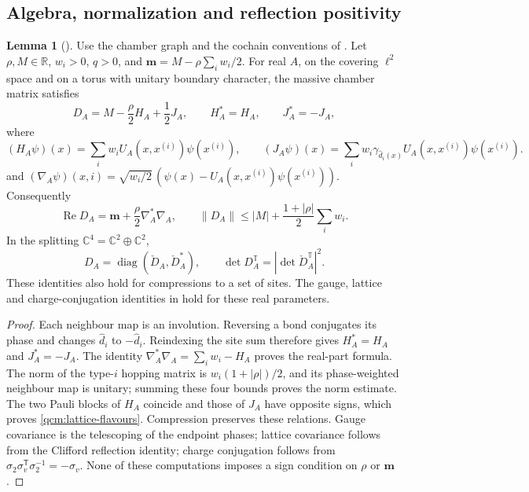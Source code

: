 \documentclass[11pt,letterpaper,reqno]{amsart}
\theoremstyle{definition}
\newtheorem{qcmlemma}[qcmproposition]{Lemma}
\newenvironment{lemma}[1][]{\pushQED{\qed}\renewcommand{\qedsymbol}{$\blacksquare$}\begin{qcmlemma}[#1]}{\popQED\end{qcmlemma}}
\begin{document}
\subsection{Algebra, normalization and reflection positivity}
\begin{lemma}\label{qcm:lattice-algebra}
Use the chamber graph and the cochain conventions of
\cite[Section~2]{QEDConstruction}. Let $\rho,M\in\mathbb R$,
$w_i>0$, $q>0$, and $\mathbf m=M-\rho\sum_iw_i/2$. For real $A$,
on the covering $\ell^2$ space and on a torus with unitary boundary
character, the massive chamber matrix satisfies
\[
 D_A=M-\frac\rho2H_A+\frac12J_A,\qquad
 H_A^*=H_A,\qquad J_A^*=-J_A,
\]
where
\[
 (H_A\psi)(x)=\sum_iw_iU_A(x,x^{(i)})\psi(x^{(i)}),\qquad
 (J_A\psi)(x)=\sum_iw_i\gamma_{\widehat d_i(x)}
                         U_A(x,x^{(i)})\psi(x^{(i)}).
\]
and $(\nabla_A\psi)(x,i)=\sqrt{w_i/2}\,
(\psi(x)-U_A(x,x^{(i)})\psi(x^{(i)}))$.
Consequently
\begin{equation}\label{qcm:lattice-real-part}
 \operatorname{Re}D_A=\mathbf m+\frac\rho2\nabla_A^*\nabla_A,
 \qquad
 \|D_A\|\le |M|+\frac{1+|\rho|}{2}\sum_iw_i.
\end{equation}
In the splitting $\mathbb C^4=\mathbb C^2\oplus\mathbb C^2$,
\begin{equation}\label{qcm:lattice-flavours}
 D_A=\operatorname{diag}(\check D_A,\check D_A^*),\qquad
 \det D_A^{\mathbb T}=|\det\check D_A^{\mathbb T}|^2.
\end{equation}
These identities also hold for compressions to a set of sites. The
gauge, lattice and charge-conjugation identities in
\cite[Section~2.4]{QEDConstruction} hold for these real parameters.
\end{lemma}

\begin{proof}
Each neighbour map is an involution. Reversing a bond conjugates its
phase and changes $\widehat d_i$ to $-\widehat d_i$. Reindexing the
site sum therefore gives $H_A^*=H_A$ and $J_A^*=-J_A$.
The identity $\nabla_A^*\nabla_A=\sum_iw_i-H_A$ proves the real-part
formula. The norm of the type-$i$ hopping matrix is
$w_i(1+|\rho|)/2$, and its phase-weighted neighbour map is unitary;
summing these four bounds proves the norm estimate. The two Pauli
blocks of $H_A$ coincide and those of $J_A$ have opposite signs,
which proves \eqref{qcm:lattice-flavours}. Compression preserves these
relations. Gauge covariance is the telescoping of the endpoint phases;
lattice covariance follows from the Clifford reflection identity;
charge conjugation follows from
$\sigma_2\sigma_v^{\mathsf T}\sigma_2^{-1}=-\sigma_v$.
None of these computations imposes a sign condition on $\rho$ or
$\mathbf m$.
\end{proof}
\end{document}
